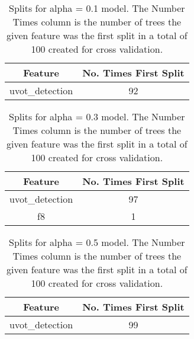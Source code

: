 \begin{table}[H]
\begin{center}
\begin{tabular}{cc}
  \hline
Feature & No. Times First Split \\ 
  \hline
uvot\_detection & 92 \\ 
   \hline
\end{tabular}
\caption{Splits for alpha = 0.1 model. The Number Times column is the number of trees the given feature was the first split in a total of 100 created for cross validation.}
\end{center}
\end{table}
\begin{table}[H]
\begin{center}
\begin{tabular}{cc}
  \hline
Feature & No. Times First Split \\ 
  \hline
uvot\_detection & 97 \\ 
  f8 & 1 \\ 
   \hline
\end{tabular}
\caption{Splits for alpha = 0.3 model. The Number Times column is the number of trees the given feature was the first split in a total of 100 created for cross validation.}
\end{center}
\end{table}
\begin{table}[H]
\begin{center}
\begin{tabular}{cc}
  \hline
Feature & No. Times First Split \\ 
  \hline
uvot\_detection & 99 \\ 
   \hline
\end{tabular}
\caption{Splits for alpha = 0.5 model. The Number Times column is the number of trees the given feature was the first split in a total of 100 created for cross validation.}
\end{center}
\end{table}
